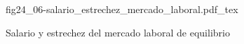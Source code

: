 \begin{figure}[h]
\centering
\def\svgwidth{0.5\textwidth}
{fig24_06-salario_estrechez_mercado_laboral.pdf_tex}
\caption{Salario y estrechez del mercado laboral de equilibrio}
\label{fig24_06-salario_estrechez_mercado_laboral}
\end{figure}
